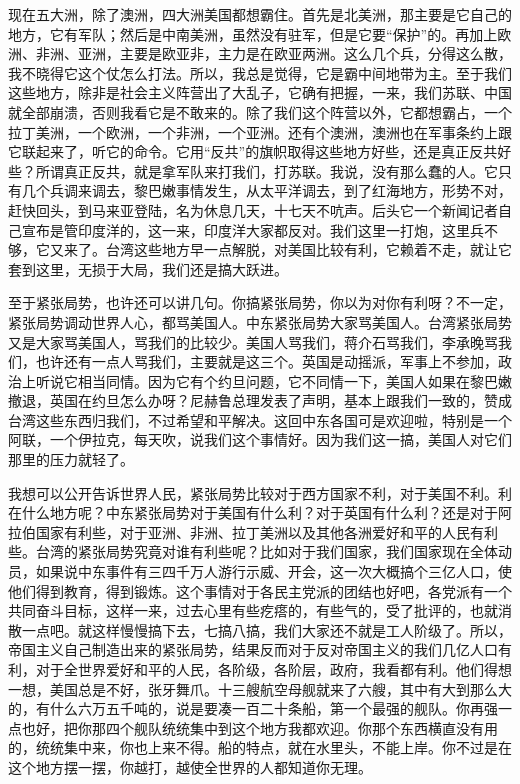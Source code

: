 现在五大洲，除了澳洲，四大洲美国都想霸住。首先是北美洲，那主要是它自己的地方，它有军队；然后是中南美洲，虽然没有驻军，但是它要“保护”的。再加上欧洲、非洲、亚洲，主要是欧亚非，主力是在欧亚两洲。这么几个兵，分得这么散，我不晓得它这个仗怎么打法。所以，我总是觉得，它是霸中间地带为主。至于我们这些地方，除非是社会主义阵营出了大乱子，它确有把握，一来，我们苏联、中国就全部崩溃，否则我看它是不敢来的。除了我们这个阵营以外，它都想霸占，一个拉丁美洲，一个欧洲，一个非洲，一个亚洲。还有个澳洲，澳洲也在军事条约上跟它联起来了，听它的命令。它用“反共”的旗帜取得这些地方好些，还是真正反共好些？所谓真正反共，就是拿军队来打我们，打苏联。我说，没有那么蠢的人。它只有几个兵调来调去，黎巴嫩事情发生，从太平洋调去，到了红海地方，形势不对，赶快回头，到马来亚登陆，名为休息几天，十七天不吭声。后头它一个新闻记者自己宣布是管印度洋的，这一来，印度洋大家都反对。我们这里一打炮，这里兵不够，它又来了。台湾这些地方早一点解脱，对美国比较有利，它赖着不走，就让它套到这里，无损于大局，我们还是搞大跃进。

至于紧张局势，也许还可以讲几句。你搞紧张局势，你以为对你有利呀？不一定，紧张局势调动世界人心，都骂美国人。中东紧张局势大家骂美国人。台湾紧张局势又是大家骂美国人，骂我们的比较少。美国人骂我们，蒋介石骂我们，李承晚骂我们，也许还有一点人骂我们，主要就是这三个。英国是动摇派，军事上不参加，政治上听说它相当同情。因为它有个约旦问题，它不同情一下，美国人如果在黎巴嫩撤退，英国在约旦怎么办呀？尼赫鲁总理发表了声明，基本上跟我们一致的，赞成台湾这些东西归我们，不过希望和平解决。这回中东各国可是欢迎啦，特别是一个阿联，一个伊拉克，每天吹，说我们这个事情好。因为我们这一搞，美国人对它们那里的压力就轻了。

我想可以公开告诉世界人民，紧张局势比较对于西方国家不利，对于美国不利。利在什么地方呢？中东紧张局势对于美国有什么利？对于英国有什么利？还是对于阿拉伯国家有利些，对于亚洲、非洲、拉丁美洲以及其他各洲爱好和平的人民有利些。台湾的紧张局势究竟对谁有利些呢？比如对于我们国家，我们国家现在全体动员，如果说中东事件有三四千万人游行示威、开会，这一次大概搞个三亿人口，使他们得到教育，得到锻炼。这个事情对于各民主党派的团结也好吧，各党派有一个共同奋斗目标，这样一来，过去心里有些疙瘩的，有些气的，受了批评的，也就消散一点吧。就这样慢慢搞下去，七搞八搞，我们大家还不就是工人阶级了。所以，帝国主义自己制造出来的紧张局势，结果反而对于反对帝国主义的我们几亿人口有利，对于全世界爱好和平的人民，各阶级，各阶层，政府，我看都有利。他们得想一想，美国总是不好，张牙舞爪。十三艘航空母舰就来了六艘，其中有大到那么大的，有什么六万五千吨的，说是要凑一百二十条船，第一个最强的舰队。你再强一点也好，把你那四个舰队统统集中到这个地方我都欢迎。你那个东西横直没有用的，统统集中来，你也上来不得。船的特点，就在水里头，不能上岸。你不过是在这个地方摆一摆，你越打，越使全世界的人都知道你无理。

